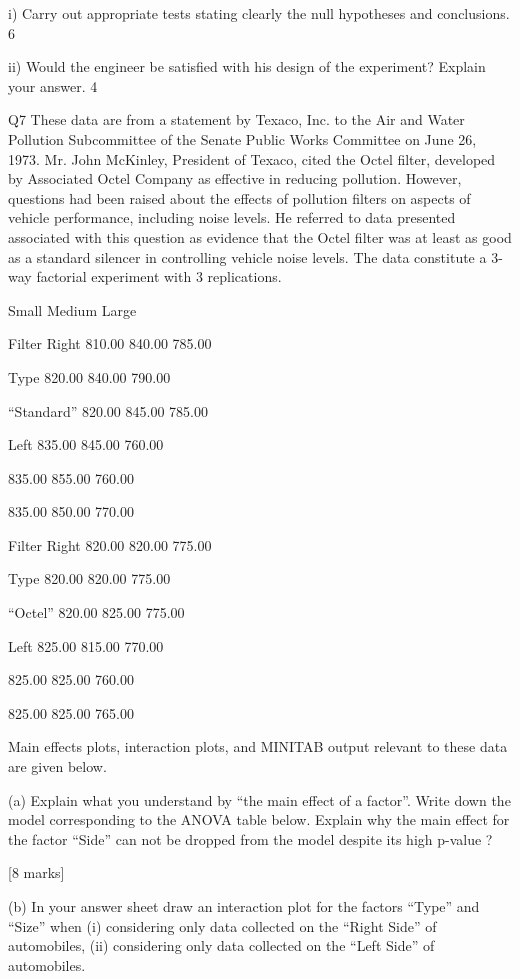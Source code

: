 i) Carry out appropriate tests stating clearly the null hypotheses and conclusions. 6

ii) Would the engineer be satisfied with his design of the experiment? Explain your answer. 4


Q7 These data are from a statement by Texaco, Inc. to the Air and Water Pollution Subcommittee of the Senate Public Works Committee on June 26, 1973. Mr. John McKinley, President of Texaco, cited the Octel filter, developed by Associated Octel Company as effective in reducing pollution. However, questions had been raised about the effects of pollution filters on aspects of vehicle performance, including noise levels. He referred to data presented associated with this question as evidence that the Octel filter was at least as good as a standard silencer in controlling vehicle noise levels. The data constitute a 3-way factorial experiment with 3 replications.

Small Medium Large

Filter Right 810.00 840.00 785.00

Type 820.00 840.00 790.00

“Standard” 820.00 845.00 785.00

Left 835.00 845.00 760.00

835.00 855.00 760.00

835.00 850.00 770.00

Filter Right 820.00 820.00 775.00

Type 820.00 820.00 775.00

“Octel” 820.00 825.00 775.00

Left 825.00 815.00 770.00

825.00 825.00 760.00

825.00 825.00 765.00

Main effects plots, interaction plots, and MINITAB output relevant to these data are given below.

(a) Explain what you understand by “the main effect of a factor”. Write down the model corresponding to the ANOVA table below. Explain why the main effect for the factor “Side” can not be dropped from the model despite its high p-value ?

[8 marks]

(b) In your answer sheet draw an interaction plot for the factors “Type” and “Size” when (i) considering only data collected on the “Right Side” of automobiles, (ii) considering only data collected on the “Left Side” of automobiles.


